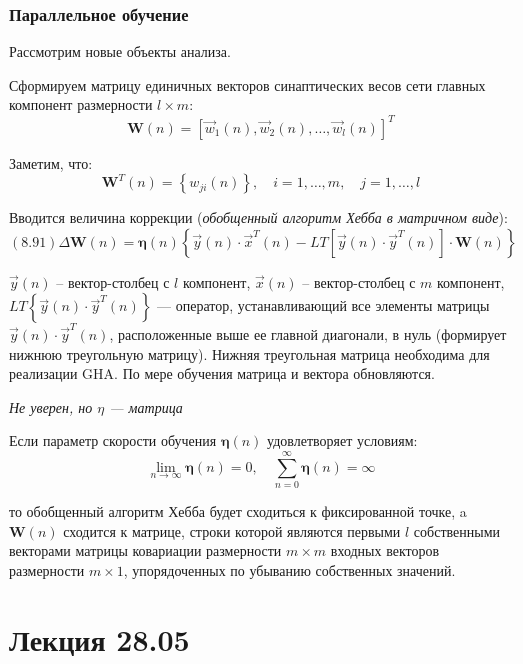 \documentclass{article}
\numberwithin{equation}{subsection}
\begin{document}
\subsubsection{Параллельное обучение}

Рассмотрим новые объекты анализа.

Сформируем матрицу единичных векторов синаптических весов сети главных компонент
размерности $l \times m$:
\begin{equation}
    \mathbf{W}(n) = 
    \left[
        \vec{w}_1(n), \vec{w}_2(n) , \dots, \vec{w}_l(n)
    \right]^T
\end{equation}

Заметим, что:
\begin{equation*}
    \mathbf{W}^T(n) = 
    \left\{
        w_{ji}(n)
    \right\}, \quad i = 1, \dots, m,\quad j=1, \dots, l
\end{equation*}

Вводится величина коррекции (\textit{обобщенный алгоритм Хебба в матричном виде}):
\begin{equation}
    (8.91)
    \Delta \mathbf{W}(n) = \mathbf{\eta}(n) 
    \left\{
        \vec{y}(n) \cdot \vec{x}^T(n) - LT
        \left[
            \vec{y}(n) \cdot \vec{y}^T(n)
        \right]
        \cdot \mathbf{W}(n)        
    \right\}
\end{equation}

\noindent
$\vec{y}(n)$ -- вектор-столбец с $l$ компонент, $\vec{x}(n)$ -- вектор-столбец с $m$ компонент,
$LT\left\{ \vec{y}(n) \cdot \vec{y}^T(n) \right\}$ --- оператор, устанавливающий все элементы 
матрицы $\vec{y}(n) \cdot \vec{y}^T(n)$, расположенные выше ее главной диагонали, в нуль
(формирует нижнюю треугольную матрицу).
Нижняя треугольная матрица необходима для реализации GHA. По мере обучения матрица и вектора 
обновляются.

\begin{myquote}
    \textit{Не уверен, но $\eta$ --- матрица}
\end{myquote}

Если параметр скорости обучения $\mathbf{\eta}(n)$ удовлетворяет условиям:
\begin{equation*}
    \lim_{n \to \infty} \mathbf{\eta}(n) = 0, \quad
    \sum_{n=0}^{\infty} \mathbf{\eta}(n) = \infty
\end{equation*}

\noindent
то обобщенный алгоритм Хебба будет сходиться к фиксированной точке, a $\mathbf{W}(n)$ сходится 
к матрице, строки которой являются первыми $l$ собственными векторами матрицы ковариации
размерности $m \times m$ входных векторов размерности $m \times 1$, упорядоченных по убыванию 
собственных значений.



\section{Лекция 28.05}
\end{document}
